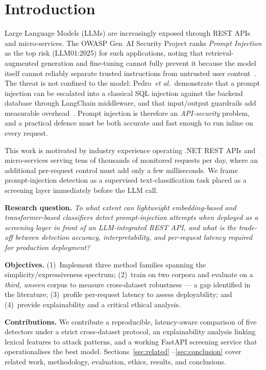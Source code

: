 \documentclass[conference]{IEEEtran}
\begin{document}
\section{Introduction}
Large Language Models (LLMs) are increasingly exposed through REST APIs and
micro-services. The OWASP Gen~AI Security Project ranks \emph{Prompt Injection}
as the top risk (LLM01:2025) for such applications, noting that
retrieval-augmented generation and fine-tuning cannot fully prevent it because
the model itself cannot reliably separate trusted instructions from untrusted
user content~\cite{owasp2025}. The threat is not confined to the model:
Pedro~\emph{et al.}\ demonstrate that a prompt injection can be escalated into a
classical SQL injection against the backend database through LangChain
middleware, and that input/output guardrails add measurable
overhead~\cite{pedro2025prompt}. Prompt injection is therefore an
\emph{API-security} problem, and a practical defence must be both accurate and
fast enough to run inline on every request.

This work is motivated by industry experience operating .NET REST APIs and
micro-services serving tens of thousands of monitored requests per day, where an
additional per-request control must add only a few milliseconds. We frame
prompt-injection detection as a supervised text-classification task placed as a
screening layer immediately before the LLM call.

\textbf{Research question.} \emph{To what extent can lightweight
embedding-based and transformer-based classifiers detect prompt-injection
attempts when deployed as a screening layer in front of an LLM-integrated REST
API, and what is the trade-off between detection accuracy, interpretability, and
per-request latency required for production deployment?}

\textbf{Objectives.} (1)~Implement three method families spanning the
simplicity/expressiveness spectrum; (2)~train on two corpora and evaluate on a
\emph{third, unseen} corpus to measure cross-dataset robustness --- a gap
identified in the literature; (3)~profile per-request latency to assess
deployability; and (4)~provide explainability and a critical ethical analysis.

\textbf{Contributions.} We contribute a reproducible, latency-aware comparison
of five detectors under a strict cross-dataset protocol, an explainability
analysis linking lexical features to attack patterns, and a working FastAPI
screening service that operationalises the best model. Sections~\ref{sec:related}
--\ref{sec:conclusion} cover related work, methodology, evaluation, ethics,
results, and conclusions.
\end{document}
